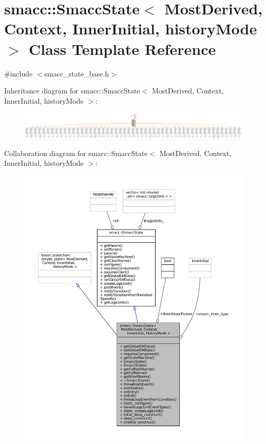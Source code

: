 \hypertarget{classsmacc_1_1SmaccState}{}\section{smacc\+:\+:Smacc\+State$<$ Most\+Derived, Context, Inner\+Initial, history\+Mode $>$ Class Template Reference}
\label{classsmacc_1_1SmaccState}


{\ttfamily \#include $<$smacc\+\_\+state\+\_\+base.\+h$>$}



Inheritance diagram for smacc\+:\+:Smacc\+State$<$ Most\+Derived, Context, Inner\+Initial, history\+Mode $>$\+:
\nopagebreak
\begin{figure}[H]
\begin{center}
\leavevmode
\includegraphics[width=350pt]{classsmacc_1_1SmaccState__inherit__graph}
\end{center}
\end{figure}


Collaboration diagram for smacc\+:\+:Smacc\+State$<$ Most\+Derived, Context, Inner\+Initial, history\+Mode $>$\+:
\nopagebreak
\begin{figure}[H]
\begin{center}
\leavevmode
\includegraphics[width=350pt]{classsmacc_1_1SmaccState__coll__graph}
\end{center}
\end{figure}
